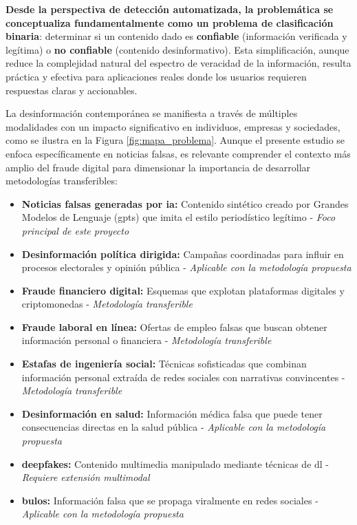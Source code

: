 \textbf{Desde la perspectiva de detección automatizada, la problemática se conceptualiza fundamentalmente como un problema de clasificación binaria}: determinar si un contenido dado es \textbf{confiable} (información verificada y legítima) o \textbf{no confiable} (contenido desinformativo). Esta simplificación, aunque reduce la complejidad natural del espectro de veracidad de la información, resulta práctica y efectiva para aplicaciones reales donde los usuarios requieren respuestas claras y accionables.

La desinformación contemporánea se manifiesta a través de múltiples modalidades con un impacto significativo en individuos, empresas y sociedades, como se ilustra en la Figura \ref{fig:mapa_problema}. Aunque el presente estudio se enfoca específicamente en noticias falsas, es relevante comprender el contexto más amplio del fraude digital para dimensionar la importancia de desarrollar metodologías transferibles:

\begin{itemize}
    \item \textbf{Noticias falsas generadas por \gls{ia}:} Contenido sintético creado por Grandes Modelos de Lenguaje (\glspl{gpt}) que imita el estilo periodístico legítimo \cite{su2023fake} - \textit{Foco principal de este proyecto}
    \item \textbf{Desinformación política dirigida:} Campañas coordinadas para influir en procesos electorales y opinión pública \cite{carcamo2021fake} - \textit{Aplicable con la metodología propuesta}
    \item \textbf{Fraude financiero digital:} Esquemas que explotan plataformas digitales y criptomonedas \cite{cao2020corporate} - \textit{Metodología transferible}
    \item \textbf{Fraude laboral en línea:} Ofertas de empleo falsas que buscan obtener información personal o financiera \cite{nasser2021online} - \textit{Metodología transferible}
    \item \textbf{Estafas de ingeniería social:} Técnicas sofisticadas que combinan información personal extraída de redes sociales con narrativas convincentes - \textit{Metodología transferible}
    \item \textbf{Desinformación en salud:} Información médica falsa que puede tener consecuencias directas en la salud pública \cite{pulido2020new} - \textit{Aplicable con la metodología propuesta}
    \item \textbf{\Glspl{deepfake}:} Contenido multimedia manipulado mediante técnicas de \gls{dl} - \textit{Requiere extensión multimodal}
    \item \textbf{\Glspl{bulo}:} Información falsa que se propaga viralmente en redes sociales - \textit{Aplicable con la metodología propuesta}
\end{itemize}

